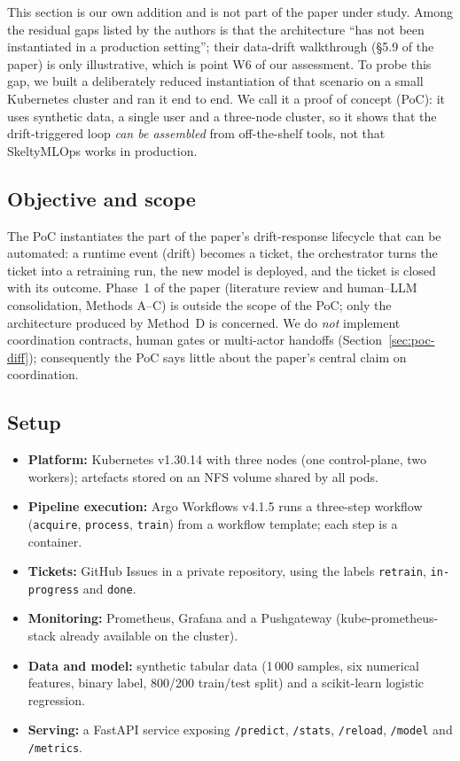 \documentclass[11pt,a4paper]{article}
\begin{document}
This section is our own addition and is not part of the paper under study.
Among the residual gaps listed by the authors is that the architecture ``has not been instantiated in a production setting''; their data-drift walkthrough (\S5.9 of the paper) is only illustrative, which is point W6 of our assessment.
To probe this gap, we built a deliberately reduced instantiation of that scenario on a small Kubernetes cluster and ran it end to end.
We call it a proof of concept (PoC): it uses synthetic data, a single user and a three-node cluster, so it shows that the drift-triggered loop \emph{can be assembled} from off-the-shelf tools, not that SkeltyMLOps works in production.

\subsection{Objective and scope}

The PoC instantiates the part of the paper's drift-response lifecycle that can be automated: a runtime event (drift) becomes a ticket, the orchestrator turns the ticket into a retraining run, the new model is deployed, and the ticket is closed with its outcome.
Phase~1 of the paper (literature review and human--LLM consolidation, Methods A--C) is outside the scope of the PoC; only the architecture produced by Method~D is concerned.
We do \emph{not} implement coordination contracts, human gates or multi-actor handoffs (Section~\ref{sec:poc-diff}); consequently the PoC says little about the paper's central claim on coordination.

\subsection{Setup}

\begin{itemize}
  \item \textbf{Platform:} Kubernetes v1.30.14 with three nodes (one control-plane, two workers); artefacts stored on an NFS volume shared by all pods.
  \item \textbf{Pipeline execution:} Argo Workflows v4.1.5 runs a three-step workflow (\texttt{acquire}, \texttt{process}, \texttt{train}) from a workflow template; each step is a container.
  \item \textbf{Tickets:} GitHub Issues in a private repository, using the labels \texttt{retrain}, \texttt{in-progress} and \texttt{done}.
  \item \textbf{Monitoring:} Prometheus, Grafana and a Pushgateway (kube-prometheus-stack already available on the cluster).
  \item \textbf{Data and model:} synthetic tabular data (1\,000 samples, six numerical features, binary label, 800/200 train/test split) and a scikit-learn logistic regression.
  \item \textbf{Serving:} a FastAPI service exposing \texttt{/predict}, \texttt{/stats}, \texttt{/reload}, \texttt{/model} and \texttt{/metrics}.
\end{itemize}
\end{document}
